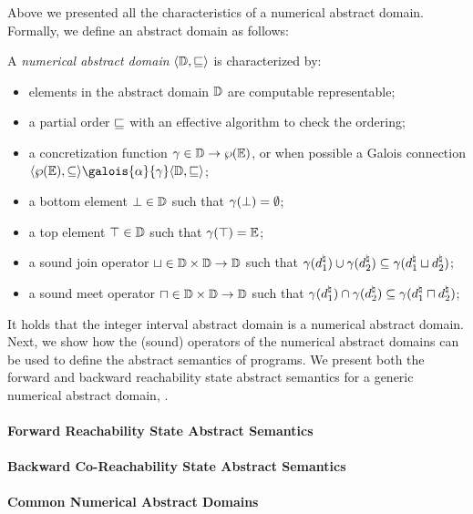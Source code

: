 Above we presented all the characteristics of a numerical abstract domain. Formally, we define an abstract domain as follows:

\begin{definition}
  A \emph{numerical abstract domain} $\langle \mathbb{D}, \sqsubseteq \rangle$ is characterized by:
  \begin{itemize}
    \item elements in the abstract domain $\mathbb{D}$ are computable representable;
    \item a partial order $\sqsubseteq$ with an effective algorithm to check the ordering;
    \item a concretization function $\gamma\in\mathbb{D}\to\wp(\mathbb{E})$, or when possible a Galois connection
    $\tuple{\setof\env}{\subseteq}\galois{\abstractdomainabstraction}{\abstractdomainconcretization}\tuple{\abstractdomain}{\abstractdomainsubseteq}$;
    \item a bottom element $\bot\in\mathbb{D}$ such that $\gamma(\bot) = \emptyset$;
    \item a top element $\top\in\mathbb{D}$ such that $\gamma(\top) = \mathbb{E}$;
    \item a sound join operator $\sqcup\in\mathbb{D}\times\mathbb{D}\to\mathbb{D}$ such that $ \gamma(d^\natural_1) \cup \gamma(d^\natural_2)\subseteq \gamma(d^\natural_1 \sqcup d^\natural_2)$;
    \item a sound meet operator $\sqcap\in\mathbb{D}\times\mathbb{D}\to\mathbb{D}$ such that $\gamma(d^\natural_1) \cap \gamma(d^\natural_2)\subseteq \gamma(d^\natural_1 \sqcap d^\natural_2)$;
  \end{itemize}
\end{definition}

It holds that the integer interval abstract domain is a numerical abstract domain.
Next, we show how the (sound) operators of the numerical abstract domains can be used to define the abstract semantics of programs. We present both the forward and backward reachability state abstract semantics for a generic numerical abstract domain, \cf{} .

\paragraph{Forward Reachability State Abstract Semantics}
\paragraph{Backward Co-Reachability State Abstract Semantics}
\paragraph{Common Numerical Abstract Domains}
